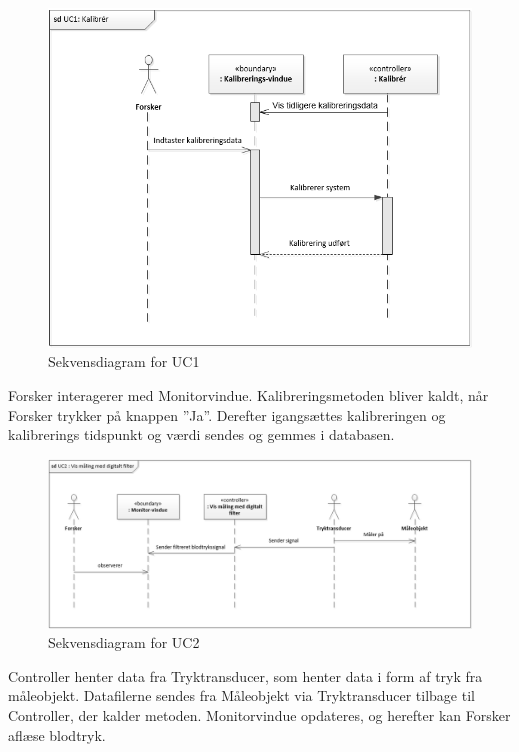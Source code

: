 \begin{figure}[H]
	\centering
	\includegraphics[width=1\textwidth]{Figurer/UC1_SD}
	\caption{Sekvensdiagram for UC1}
\end{figure}

Forsker interagerer med Monitorvindue. Kalibreringsmetoden bliver kaldt, når Forsker trykker på knappen ”Ja”. Derefter igangsættes kalibreringen og kalibrerings tidspunkt og værdi sendes og gemmes i databasen. 

\begin{figure}[H]
	\centering
	\includegraphics[width=1\textwidth]{Figurer/UC2_SD}
	\caption{Sekvensdiagram for UC2}
\end{figure}

Controller henter data fra Tryktransducer, som henter data i form af tryk fra måleobjekt. Datafilerne sendes fra Måleobjekt via Tryktransducer tilbage til Controller, der kalder metoden. Monitorvindue opdateres, og herefter kan Forsker aflæse blodtryk. 

